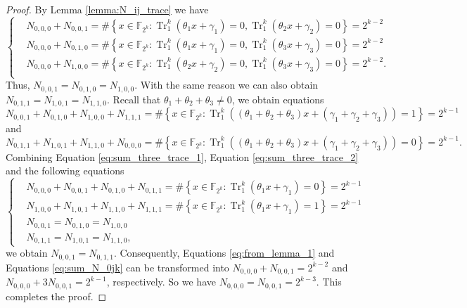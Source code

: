 \documentclass{article}
\newcommand{\F}{\mathbb{F}}
\newcommand{\0}{\textbf{0}}
\newcommand{\1}{\textbf{1}}
\newcommand{\TRACE}{\operatorname{Tr}_1^k}
\theoremstyle{plain}
\begin{document}
    \begin{proof}
        By Lemma \ref{lemma:N_ij_trace} we have
        \begin{equation}\label{eq:from_lemma_1}\left\{\begin{alignedat}{3}
        &N_{0,0,0}+N_{0,0,1}=\#\left\{x\in\F_{2^k} : \TRACE\left(\theta_1x+\gamma_1\right)=0, \TRACE\left(\theta_2x+\gamma_2\right)=0\right\}=2^{k-2}\\
        &N_{0,0,0}+N_{0,1,0}=\#\left\{x\in\F_{2^k} : \TRACE\left(\theta_1x+\gamma_1\right)=0, \TRACE\left(\theta_3x+\gamma_3\right)=0\right\}=2^{k-2}\\
        &N_{0,0,0}+N_{1,0,0}=\#\left\{x\in\F_{2^k} : \TRACE\left(\theta_2x+\gamma_2\right)=0, \TRACE\left(\theta_3x+\gamma_3\right)=0\right\}=2^{k-2}.\\
        \end{alignedat}\right.\end{equation}
        Thus, $N_{0,0,1}=N_{0,1,0}=N_{1,0,0}$. With the same reason we can also obtain  $N_{0,1,1}=N_{1,0,1}=N_{1,1,0}$.
        Recall that $\theta_1+\theta_2+\theta_3\ne 0$, we obtain equations
        \begin{equation}\label{eq:sum_three_trace_1}
            N_{0,0,1}+N_{0,1,0}+N_{1,0,0}+N_{1,1,1}=\#\left\{x\in\F_{2^k} : \TRACE\left(\left(\theta_1+\theta_2+\theta_3\right)x+\left(\gamma_1+\gamma_2+\gamma_3\right)\right)=1\right\}=2^{k-1}
        \end{equation}
        and
        \begin{equation}\label{eq:sum_three_trace_2}
            N_{0,1,1}+N_{1,0,1}+N_{1,1,0}+N_{0,0,0}=\#\left\{x\in\F_{2^k} : \TRACE\left(\left(\theta_1+\theta_2+\theta_3\right)x+\left(\gamma_1+\gamma_2+\gamma_3\right)\right)=0\right\}=2^{k-1}.
        \end{equation}
        Combining Equation \eqref{eq:sum_three_trace_1}, Equation \eqref{eq:sum_three_trace_2} and the following equations
        \begin{equation}\label{eq:sum_N_0jk}\left\{\begin{alignedat}{2}
            &N_{0,0,0}+N_{0,0,1}+N_{0,1,0}+N_{0,1,1}=\#\left\{x\in\F_{2^k} : \TRACE\left(\theta_1x+\gamma_1\right)=0\right\}=2^{k-1}\\
            &N_{1,0,0}+N_{1,0,1}+N_{1,1,0}+N_{1,1,1}=\#\left\{x\in\F_{2^k} : \TRACE\left(\theta_1x+\gamma_1\right)=1\right\}=2^{k-1}\\
            &N_{0,0,1}=N_{0,1,0}=N_{1,0,0}\\
            &N_{0,1,1}=N_{1,0,1}=N_{1,1,0},
        \end{alignedat}\right.\end{equation}
        we obtain $N_{0,0,1}=N_{0,1,1}$.
        Consequently, Equations \eqref{eq:from_lemma_1} and Equations \eqref{eq:sum_N_0jk} can be transformed into
        $N_{0,0,0}+N_{0,0,1}=2^{k-2}$ and $N_{0,0,0}+3N_{0,0,1}=2^{k-1}$, respectively.
        So we have $N_{0,0,0}=N_{0,0,1}=2^{k-3}$. This completes the proof.
    \end{proof}
\end{document}

